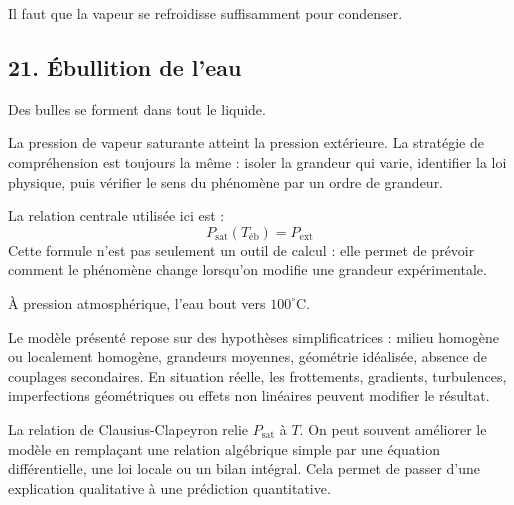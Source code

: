 \documentclass[11pt,a4paper]{article}
\begin{document}
\begin{corrigebox}[Indication]
Il faut que la vapeur se refroidisse suffisamment pour condenser.
\end{corrigebox}


\subsection{21. Ébullition de l'eau}

\begin{exemplebox}
Des bulles se forment dans tout le liquide.
\end{exemplebox}

\begin{methodebox}
La pression de vapeur saturante atteint la pression extérieure.
La stratégie de compréhension est toujours la même : isoler la grandeur qui varie, identifier la loi physique, puis vérifier le sens du phénomène par un ordre de grandeur.
\end{methodebox}

\begin{theorembox}
La relation centrale utilisée ici est :
\[
P_{\mathrm{sat}}(T_{\mathrm{éb}})=P_{\mathrm{ext}}
\]
Cette formule n'est pas seulement un outil de calcul : elle permet de prévoir comment le phénomène change lorsqu'on modifie une grandeur expérimentale.
\end{theorembox}

\begin{odgbox}
À pression atmosphérique, l'eau bout vers $100^\circ$C.
\end{odgbox}

\begin{attentionbox}
Le modèle présenté repose sur des hypothèses simplificatrices : milieu homogène ou localement homogène, grandeurs moyennes, géométrie idéalisée, absence de couplages secondaires. En situation réelle, les frottements, gradients, turbulences, imperfections géométriques ou effets non linéaires peuvent modifier le résultat.
\end{attentionbox}

\begin{approfondissementbox}
La relation de Clausius-Clapeyron relie $P_{\mathrm{sat}}$ à $T$.
On peut souvent améliorer le modèle en remplaçant une relation algébrique simple par une équation différentielle, une loi locale ou un bilan intégral. Cela permet de passer d'une explication qualitative à une prédiction quantitative.
\end{approfondissementbox}
\end{document}
